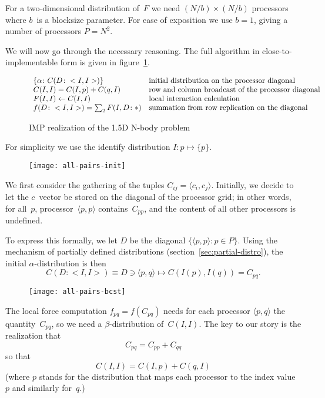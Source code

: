 For a two-dimensional distribution of~$F$ we need $(N/b)\times (N/b)$ processors
where $b$~is a blocksize parameter. For ease of exposition we use $b=1$,
giving a number of processors $P=N^2$.

We will now go through the necessary reasoning. The full algorithm in
close-to-implementable form is given in figure~\ref{fig:nbody-1.5d}.
\begin{figure}[t]
  \begin{equation}
    \begin{array}{ll}
      \{\alpha\colon C( D\colon <I,I>) \}&\hbox{initial distribution on the processor diagonal}\\
      C(I,I) = C(I,p)+C(q,I)&\hbox{row and column broadcast of the processor diagonal}\\
      F(I,I)\leftarrow C(I,I)&\hbox{local interaction calculation}\\
      f(D\colon<I,I>)=\sum_2 F(I,D\colon *)&\hbox{summation from row replication on the diagonal}
    \end{array}
    \label{eq:nbody-1.5d}
  \end{equation}
  \caption{IMP realization of the 1.5D N-body problem}
  \label{fig:nbody-1.5d}
\end{figure}
For simplicity we use the identify distribution $I\colon p\mapsto\{p\}$.


\begin{wrapfigure}{r}{2in}
  \texttt{[image: all-pairs-init]}
\end{wrapfigure}
%
We first consider the gathering of the tuples $C_{ij}=\langle c_i,c_j\rangle$.
Initially, we decide to let the $c$~vector be stored on the diagonal of the processor grid;
in other words,
for all~$p$, processor~$\langle p,p\rangle$ contains~$C_{pp}$,
and the content of all other processors is undefined.

To express this formally, we let $D$ be the diagonal $\{\langle p,p\rangle\colon p\in P\}$.
Using the mechanism of partially defined distributions
(section~\ref{sec:partial-distro}), the initial $\alpha$-distribution is then
\begin{equation}
C( D\colon <I,I>)\equiv D\ni \langle p,q\rangle\mapsto
C(I(p),I(q))=C_{pq}.
\label{eq:c-alpha}
\end{equation}


\begin{wrapfigure}{r}{2in}
  \texttt{[image: all-pairs-bcst]}
\end{wrapfigure}
%
The local force computation $f_{pq}=f(C_{pq})$ needs for each processor $\langle p,q\rangle$
the quantity~$C_{pq}$, so we need a $\beta$-distribution of~$C(I,I)$.
The key to our story is the realization that 
\[ C_{pq} = C_{pp}+C_{qq} \]
so that
\[ C(I,I) = C(I,p)+C(q,I) \]
(where $p$ stands for the distribution that maps each processor
to the index value~$p$ and similarly for~$q$.)

